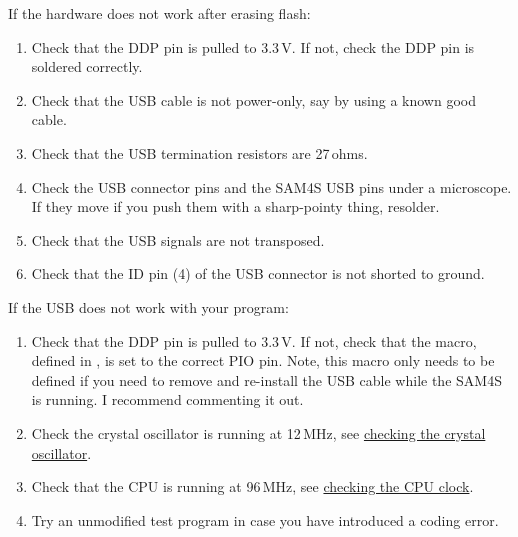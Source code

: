 If the hardware does not work after erasing flash:
%
\begin{enumerate}

  \item Check that the DDP pin is pulled to 3.3\,V.  If not, check the
  DDP pin is soldered correctly.

  \item Check that the USB cable is not power-only, say by using a
    known good cable.

  \item
    Check that the USB termination resistors are 27\,ohms.

  \item Check the USB connector pins and the SAM4S USB pins under a
    microscope.  If they move if you push them with a sharp-pointy
    thing, resolder.

  \item
    Check that the USB signals are not transposed.

  \item Check that the ID pin (4) of the USB connector is not shorted
    to ground.

\end{enumerate}


If the USB does not work with your program:

\begin{enumerate}

  \item Check that the DDP pin is pulled to 3.3\,V.  If not, check
    that the  macro, defined in , is
    set to the correct PIO pin.  Note, this macro only needs to be
    defined if you need to remove and re-install the USB cable while
    the SAM4S is running.  I recommend commenting it out.

  \item Check the crystal oscillator is running at 12\,MHz, see
    \protect\hyperref[checking-the-crystal-oscillator]{checking the
      crystal oscillator}.

  \item Check that the CPU is running at 96\,MHz, see
    \protect\hyperref[checking-the-clock]{checking the CPU clock}.

  \item Try an unmodified test program in case you have introduced a
    coding error.

\end{enumerate}


